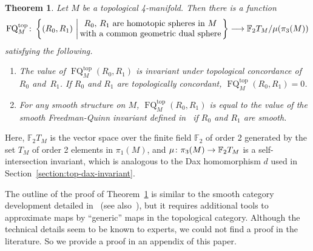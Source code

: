 \documentclass[11pt]{amsart}
\def\to{\mathchoice{\longrightarrow}{\rightarrow}{\rightarrow}{\rightarrow}}
\newtheorem{theorem}{Theorem}[section]
\theoremstyle{definition}
\theoremstyle{theorem-giventitle}
\theoremstyle{definition-giventitle}
\numberwithin{equation}{section}
\def\bF{{\mathbb{F}}}
\def\top{\mathrm{top}}
\def\FQ{\operatorname{FQ}}
\begin{document}
\begin{theorem}
  \label{theorem:fq-top}
  Let $M$ be a topological 4-manifold.
  Then there is a function
  \[
    \FQ^\top_M \colon \left\{ (R_0, R_1) \, \left| \,
    \begin{tabular}{@{}c@{}}
      $R_0$, $R_1$ are homotopic spheres in $M$ \\
      with a common geometric dual sphere
    \end{tabular} \right.\right\}
    \to \bF_2 T_M / \mu(\pi_3(M))
  \]
  satisfying the following.
  \begin{enumerate}
    \item The value of $\FQ^\top_M(R_0,R_1)$ is invariant under topological concordance of $R_0$ and~$R_1$.
    If $R_0$ and $R_1$ are topologically concordant, $\FQ^\top_M(R_0,R_1)=0$.
    \item For any smooth structure on $M$, $\FQ^\top_M(R_0,R_1)$ is equal to the value of the smooth Freedman-Quinn invariant defined in~\cite{Schneiderman-Teichner:2022-1,Klug-Miller:2021-1,Klug-Miller:2022-1} if $R_0$ and $R_1$ are smooth.
  \end{enumerate}
\end{theorem}

Here, $\bF_2 T_M$ is the vector space over the finite field $\bF_2$ of order 2 generated by the set $T_M$ of order 2 elements in $\pi_1(M)$, and $\mu\colon \pi_3(M)\to \bF_2 T_M$ is a self-intersection invariant, which is analogous to the Dax homomorphism $d$ used in Section~\ref{section:top-dax-invariant}.

The outline of the proof of Theorem~\ref{theorem:fq-top} is similar to the smooth category development detailed in~\cite[Section~4]{Schneiderman-Teichner:2022-1} (see also~\cite{Klug-Miller:2021-1,Klug-Miller:2022-1}), but it requires additional tools to approximate maps by ``generic'' maps in the topological category.
Although the technical details seem to be known to experts, we could not find a proof in the literature.
So we provide a proof in an appendix of this paper.
\end{document}
